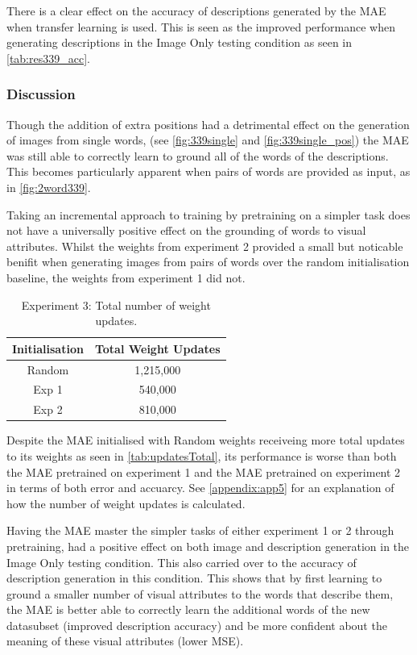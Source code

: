 There is a clear effect on the accuracy of descriptions generated by the MAE when transfer learning is used. This is seen as the improved performance when generating descriptions in the Image Only testing condition as seen in \autoref{tab:res339_acc}.


\subsubsection{Discussion}
Though the addition of extra positions had a detrimental effect on the generation of images from single words, (see \autoref{fig:339single} and \autoref{fig:339single_pos}) the MAE was still able to correctly learn to ground all of the words of the descriptions. This becomes particularly apparent when pairs of words are provided as input, as in \autoref{fig:2word339}.

Taking an incremental approach to training by pretraining on a simpler task does not have a universally positive effect on the grounding of words to visual attributes. Whilst the weights from experiment 2 provided a small but noticable benifit when generating images from pairs of words over the random initialisation baseline, the weights from experiment 1 did not. 

\begin{table}
\centering
\begin{tabular}{|c|c|}
\hline
\textbf{Initialisation} & \textbf{Total Weight Updates}\\ \hline
Random &  1,215,000\\ \hline
Exp 1 &  540,000\\ \hline
Exp 2 &  810,000\\ \hline

\end{tabular}
\caption{Experiment 3: Total number of weight updates.}
\label{tab:updatesTotal}
\end{table}

Despite the MAE initialised with Random weights receiveing more total updates to its weights as seen in \autoref{tab:updatesTotal}, its performance is worse than both the MAE pretrained on experiment 1 and the MAE pretrained on experiment 2 in terms of both error and accuarcy. See \autoref{appendix:app5} for an explanation of how the number of weight updates is calculated.

Having the MAE master the simpler tasks of either experiment 1 or 2 through pretraining, had a positive effect on both image and description generation in the Image Only testing condition. This also carried over to the accuracy of description generation in this condition. This shows that by first learning to ground a smaller number of visual attributes to the words that describe them, the MAE is better able to correctly learn the additional words of the new datasubset (improved description accuracy) and be more confident about the meaning of these visual attributes (lower MSE).


